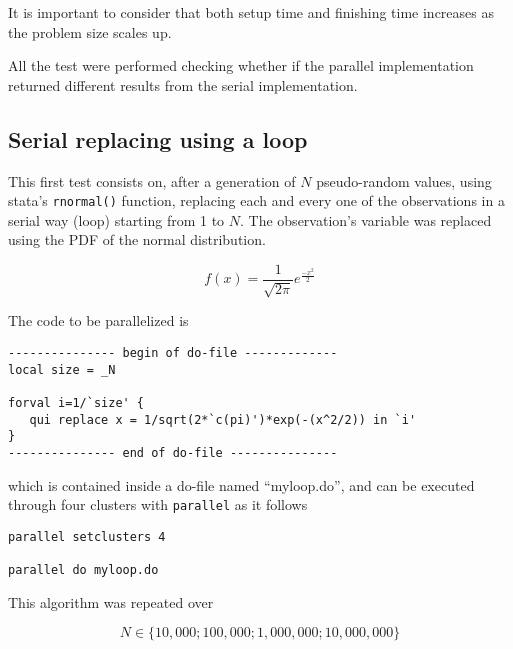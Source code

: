 \documentclass[letterpaper, 10pt]{article}
\begin{document}
It is important to consider that both setup time and finishing time increases as the problem size scales up.

All the test were performed checking whether if the parallel implementation returned different results from the serial implementation.

\subsection{Serial replacing using a loop}

This first test consists on, after a generation of $N$ pseudo-random values, using stata's {\tt rnormal()} function, replacing each and every one of the observations in a serial way (loop) starting from 1 to $N$. The observation's variable was replaced using the PDF of the normal distribution.

\begin{equation}
f(x) = \frac{1}{\sqrt{2\pi}}e^{\frac{-x^2}{2}}
\end{equation}

The code to be parallelized is

\begin{Verbatim}[tabsize=4, fontsize=\footnotesize]
--------------- begin of do-file -------------
local size = _N

forval i=1/`size' {
   qui replace x = 1/sqrt(2*`c(pi)')*exp(-(x^2/2)) in `i'
}
--------------- end of do-file ---------------
\end{Verbatim}

\noindent which is contained inside a do-file named ``myloop.do'', and can be executed through four clusters with {\tt parallel} as it follows

\begin{Verbatim}[tabsize=4, fontsize=\footnotesize]
parallel setclusters 4

parallel do myloop.do
\end{Verbatim}

This algorithm was repeated over 

\begin{equation*}N \in \{10,000; 100,000; 1,000,000; 10,000,000\}\end{equation*}
\end{document}
